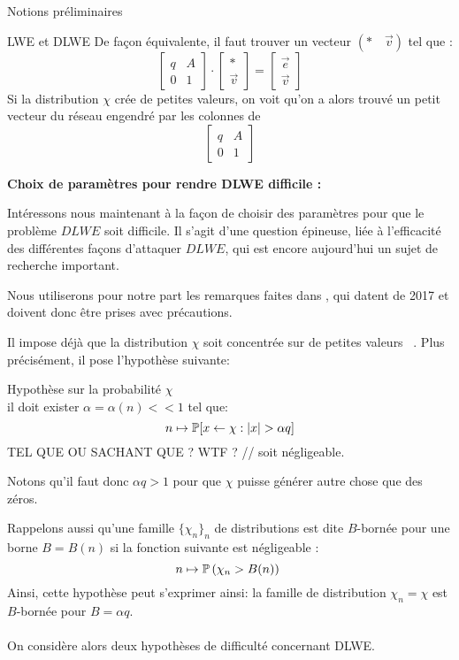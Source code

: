\begin{section}{Notions préliminaires}
\begin{subsection}{LWE et DLWE}
	De façon équivalente, il faut trouver un vecteur $(*\quad\vec{v})$ tel que :
	\[ \begin{bmatrix}q & A \\ 0 &1 \end{bmatrix}\cdot
	   \begin{bmatrix}* \\ \vec{v} \end{bmatrix} =
	   \begin{bmatrix} \vec{e} \\ \vec{v} \end{bmatrix} \]
	Si la distribution $\chi$ crée de petites valeurs, on voit qu'on a alors trouvé un \og petit \fg~ vecteur du réseau engendré par les colonnes de 
	\[ \begin{bmatrix}q & A \\ 0 &1 \end{bmatrix} \]

	\textbf{Choix de paramètres pour rendre DLWE difficile :}

	Intéressons nous maintenant à la façon de choisir des paramètres
	pour que le problème $DLWE$ soit difficile. Il s'agit d'une question épineuse, 
	liée à l'efficacité des différentes façons d'attaquer $DLWE$, qui est encore aujourd'hui
	un sujet de recherche important.

	Nous utiliserons pour notre part les remarques faites dans \cite{halevi}, qui datent de 
	2017 et doivent donc être prises avec précautions. 

	Il impose déjà que la distribution $\chi$ soit \og concentrée sur de
	petites valeurs \fg~. Plus précisément, il pose l'hypothèse suivante: 
	\begin{hyp}{Hypothèse sur la probabilité $\chi$}\\ \label{hyp:proba}
	il doit exister $\alpha = \alpha(n) <\!\!\!< 1$ tel que:
	\[ n \mapsto \mathbb{P} [x \leftarrow \chi : |x| > \alpha q]\]
	TEL QUE OU SACHANT QUE ? WTF ? //
	soit négligeable.
	\end{hyp}
	Notons qu'il faut donc $\alpha q > 1$ pour que $\chi$ puisse générer autre chose 
	que des zéros. 

	Rappelons aussi qu'une famille $\{\chi_n\}_n$ de distributions est dite $B$-bornée pour une borne $B = B(n)$ si
	la fonction suivante est négligeable : 
	\[n \mapsto \PP\left(\chi_n > B(n)\right) \] 
	Ainsi, cette hypothèse peut s'exprimer ainsi: la famille de distribution $\chi_n = \chi$ est $B$-bornée pour $B
	= \alpha q$.


	\paragraph{}
	On considère alors deux hypothèses de difficulté 
	concernant DLWE. 


\end{subsection}
\end{section}
